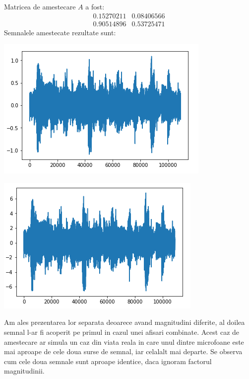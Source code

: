 \documentclass[12pt,oneside]{article}
\begin{document}
Matricea de amestecare $A$ a fost:
\[
 \begin{matrix}
	0.15270211 & 0.08406566 \\
	0.90514896 & 0.53725471
 \end{matrix}
\]
Semnalele amestecate rezultate sunt:
\begin{center}
	\includegraphics[scale=1]{music_mixed_1}
 \end{center}
\begin{center}
	\includegraphics[scale=1]{music_mixed_2}
 \end{center}
 Am ales prezentarea lor separata deoarece avand magnitudini diferite, al doilea semnal l-ar fi acoperit pe primul in cazul unei afisari combinate. Acest caz de amestecare ar simula un caz din viata reala in care unul dintre microfoane este mai aproape de cele doua surse de semnal, iar celalalt mai departe. Se observa cum cele doua semnale sunt aproape identice, daca ignoram factorul magnitudinii. 
\end{document}
